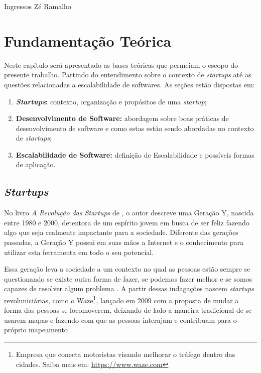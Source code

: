 Ingressos Zé Ramalho\chapter[Fundamentação Teórica]{Fundamentação Teórica}

Neste capítulo será apresentado as bases teóricas que permeiam o escopo
do presente trabalho. Partindo do entendimento sobre o contexto de
\textit{startups} até as questões relacionadas a escalabilidade de softwares.
As seções estão dispostas em:

  \begin{enumerate}
    \item \textbf{\textit{Startups}:} contexto, organização e propósitos de uma 
      \textit{startup};
    \item \textbf{Desenvolvimento de Software:} abordagem sobre boas práticas
    de desenvolvimento de software e como estas estão sendo abordadas no contexto
    de \textit{startups};
    \item \textbf{Escalabilidade de Software:} definição de Escalabilidade e 
      possíveis formas de aplicação.
  \end{enumerate}

\section{\textit{Startups}}

No livro \textit{A Revolução das Startups} de ,
o autor descreve uma Geração Y, nascida entre 1980 e 2000, detentora de um
espírito jovem em busca de ser feliz fazendo algo que seja realmente
impactante para a sociedade. Diferente das gerações passadas, a Geração Y
possui em suas mãos a Internet e o conhecimento para utilizar esta
ferramenta em todo o seu potencial.

Essa geração leva a sociedade a um contexto no qual as pessoas estão sempre
se questionando se existe outra forma de fazer, se podemos fazer melhor e
se somos capazes de resolver algum problema \cite{ARevolucaoDasStartups}.
A partir dessas indagações nascem \textit{startups} revoluniciárias, como
o Waze\footnote{Empresa que conecta motoristas visando melhorar o tráfego
dentro das cidades. Saiba mais em: \url{https://www.waze.com}}, lançado em
2009 com a proposta de mudar a forma das pessoas se locomoverem, deixando 
de lado a maneira tradicional de se usarem mapas e fazendo com que as 
pessoas interajam e contribuam para o próprio mapeamento
\cite{NepomucenoSucessoDoWaze}.

